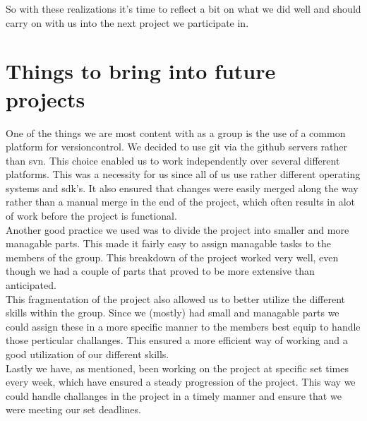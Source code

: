 So with these realizations it's time to reflect a bit on what we did well and should carry on with us into the next project we participate in.

\section{Things to bring into future projects}
One of the things we are most content with as a group is the use of a common platform for versioncontrol. We decided to use git via the github servers rather than svn. This choice enabled us to work independently over several different platforms. This was a necessity for us since all of us use rather different operating systems and sdk's. It also ensured that changes were easily merged along the way rather than a manual merge in the end of the project, which often results in alot of work before the project is functional. \\
Another good practice we used was to divide the project into smaller and more managable parts. This made it fairly easy to assign managable tasks to the members of the group. This breakdown of the project worked very well, even though we had a couple of parts that proved to be more extensive than anticipated. \\
This fragmentation of the project also allowed us to better utilize the different skills within the group. Since we (mostly) had small and managable parts we could assign these in a more specific manner to the members best equip to handle those perticular challanges. This ensured a more efficient way of working and a good utilization of our different skills. \\
Lastly we have, as mentioned, been working on the project at specific set times every week, which have ensured a steady progression of the project. This way we could handle challanges in the project in a timely manner and  ensure that we were meeting our set deadlines.



